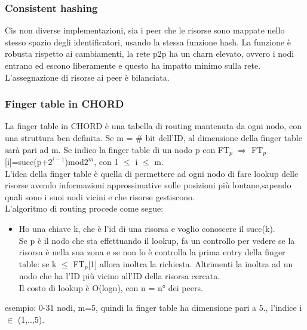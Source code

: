 \documentclass[16px]{article}
\begin{document}
\subsubsection{Consistent hashing}
Cis non diverse implementazioni, sia i peer che le risorse sono mappate nello stesso spazio degli identificatori, usando la stessa funzione hash. La funzione è robusta rispetto ai cambiamenti, la rete p2p ha un charn elevato, ovvero i nodi entrano ed escono liberamente e questo ha impatto minimo sulla rete.\\ L'assegnazione di risorse ai peer è bilanciata.
\subsubsection{Finger table in CHORD}
La finger table in CHORD è una tabella di routing mantenuta da ogni nodo, con una struttura ben definita. Se m = \# bit dell'ID, al dimensione della finger table sarà pari ad m. Se indico la finger table di un nodo p con FT$_{p}$ $\Rightarrow$ FT$_{p}$[i]=succ(p+$2^{i-1}$)mod$2^m$, con 1 $\leq$ i $\leq$ m. \\ L'idea della finger table è quella di permettere ad ogni nodo di fare lookup delle risorse avendo informazioni approssimative sulle posizioni più lontane,sapendo quali sono i suoi nodi vicini e che risorse gestiscono.\\ L'algoritmo di routing procede come segue:
\begin{itemize}
\item Ho una chiave k, che è l'id di una risorsa e voglio conoscere il succ(k).
\\ Se p è il nodo che sta effettuando il lookup, fa un controllo per vedere se la risorsa è nella sua zona e se non lo è controlla la prima entry della finger table: se k $\leq$ FT$_{p}$[1] allora inoltra la richiesta. Altrimenti la inoltra ad un nodo che ha l'ID più vicino all'ID della risorsa cercata.\\ Il costo di lookup è O(logn), con n = n° dei peers.
\end{itemize}
esempio: 0-31 nodi, m=5, quindi la finger table ha dimensione pari a 5., l'indice i $\in$ (1,..,5).
\end{document}
